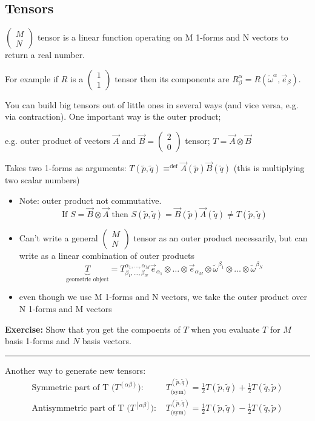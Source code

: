 \documentclass[a4paper]{article} %
\newcommand{\exercise}[2]
{
\begin{framed}
\textbf{Exercise:} #1 \\\hrule
#2
\end{framed}
}
\newcommand{\pmx}[1]{
\begin{pmatrix}
#1
\end{pmatrix}
}
\renewcommand{\tilde}{\widetilde}
\begin{document}
\subsection{Tensors}
$\pmx{M\\N}$ tensor is a linear function operating on M 1-forms and N vectors to return a real number. 

For example if $R$ is a $\pmx{1\\1}$ tensor then its components are $R^{\alpha}_{\beta}=R(\tilde{\omega}^{\alpha},\vec{e}_{\beta})$.

You can build big tensors out of little ones in several ways (and vice versa, e.g. via contraction). One important way is the outer product; 

e.g. outer product of vectors $\vec{A}$ and $\vec{B}=\pmx{2\\0}$ tensor; $T=\vec{A}\otimes \vec{B}$

Takes two 1-forms as arguments: $T(\tilde{p},\tilde{q}) \equiv^{\text{def}}\vec{A}(\tilde{p})\vec{B}(\tilde{q})$ (this is multiplying two scalar numbers)

\begin{itemize}
\item Note: outer product not commutative.
\begin{equation}
\text{If } S=\vec{B}\otimes \vec{A} \text{ then } S(\tilde{p},\tilde{q})=\vec{B}(\tilde{p})\vec{A}(\tilde{q})\neq T(\tilde{p},\tilde{q})
\end{equation}
\item Can't write a general $\pmx{M\\N}$ tensor as an outer product necessarily, but can write as a linear combination of outer products
\begin{equation}
\underbrace{T}_{\text{geometric object}}=T^{\alpha_{1},\ldots,\alpha_{M}}_{\beta_{1},\ldots,\beta_{N}}\vec{e}_{\alpha_{1}}\otimes\ldots\otimes \vec{e}_{\alpha_{M}}\otimes \tilde{\omega}^{\beta_{1}}\otimes\ldots\otimes\tilde{\omega}^{\beta_{N}}
\end{equation}
\item even though we use M 1-forms and N vectors, we take the outer product over N 1-forms and M vectors
\end{itemize}

\exercise{Show that you get the compoents of $T$ when you evaluate $T$ for $M$ basis 1-forms and $N$ basis vectors.}{}

Another way to generate new tensors:
\begin{align*}
\text{Symmetric part of T ($T^{(\alpha\beta)}$): }& T_{\text{(sym)}}^{(\tilde{p},\tilde{q})}=\frac{1}{2}T(\tilde{p},\tilde{q})+\frac{1}{2}T(\tilde{q},\tilde{p})\\
\text{Antisymmetric part of T ($T^{[\alpha\beta]}$): }& T_{\text{(sym)}}^{(\tilde{p},\tilde{q})}=\frac{1}{2}T(\tilde{p},\tilde{q})-\frac{1}{2}T(\tilde{q},\tilde{p})\\
\end{align*}
\end{document}
